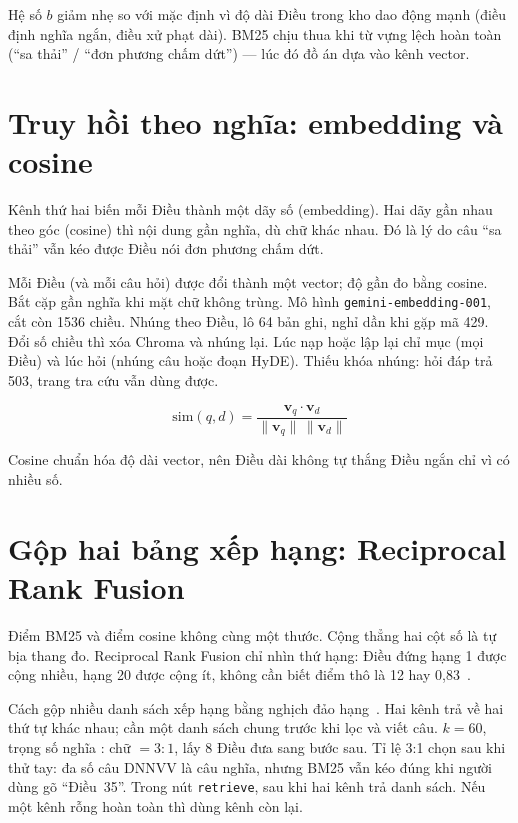 Hệ số $b$ giảm nhẹ so với mặc định vì độ dài Điều trong kho dao động mạnh (điều
định nghĩa ngắn, điều xử phạt dài). BM25 chịu thua khi từ vựng lệch hoàn toàn
(``sa thải'' / ``đơn phương chấm dứt'') --- lúc đó đồ án dựa vào kênh vector.

\section{Truy hồi theo nghĩa: embedding và cosine}

Kênh thứ hai biến mỗi Điều thành một dãy số (embedding). Hai dãy gần nhau theo
góc (cosine) thì nội dung gần nghĩa, dù chữ khác nhau. Đó là lý do câu ``sa
thải'' vẫn kéo được Điều nói đơn phương chấm dứt.

\boncau
{Mỗi Điều (và mỗi câu hỏi) được đổi thành một vector; độ gần đo bằng cosine.}
{Bắt cặp gần nghĩa khi mặt chữ không trùng.}
{Mô hình \texttt{gemini-embedding-001}, cắt còn 1536 chiều. Nhúng theo Điều, lô
64 bản ghi, nghỉ dần khi gặp mã 429. Đổi số chiều thì xóa Chroma và nhúng lại.}
{Lúc nạp hoặc lập lại chỉ mục (mọi Điều) và lúc hỏi (nhúng câu hoặc đoạn HyDE).
Thiếu khóa nhúng: hỏi đáp trả 503, trang tra cứu vẫn dùng được.}

\begin{equation}
\label{eq:cosine}
\mathrm{sim}(q, d) = \frac{\mathbf{v}_q \cdot \mathbf{v}_d}
                          {\lVert \mathbf{v}_q \rVert \, \lVert \mathbf{v}_d \rVert}
\end{equation}

Cosine chuẩn hóa độ dài vector, nên Điều dài không tự thắng Điều ngắn chỉ vì
có nhiều số.

\section{Gộp hai bảng xếp hạng: Reciprocal Rank Fusion}

Điểm BM25 và điểm cosine không cùng một thước. Cộng thẳng hai cột số là tự bịa
thang đo. Reciprocal Rank Fusion chỉ nhìn thứ hạng: Điều đứng hạng 1 được cộng
nhiều, hạng 20 được cộng ít, không cần biết điểm thô là 12 hay 0,83~\cite{cormack2009rrf}.

\boncau
{Cách gộp nhiều danh sách xếp hạng bằng nghịch đảo hạng~\cite{cormack2009rrf}.}
{Hai kênh trả về hai thứ tự khác nhau; cần một danh sách chung trước khi lọc
và viết câu.}
{$k=60$, trọng số nghĩa : chữ $= 3:1$, lấy 8 Điều đưa sang bước sau. Tỉ lệ 3:1
chọn sau khi thử tay: đa số câu DNNVV là câu nghĩa, nhưng BM25 vẫn kéo đúng khi
người dùng gõ ``Điều~35''.}
{Trong nút \texttt{retrieve}, sau khi hai kênh trả danh sách. Nếu một kênh rỗng
hoàn toàn thì dùng kênh còn lại.}


